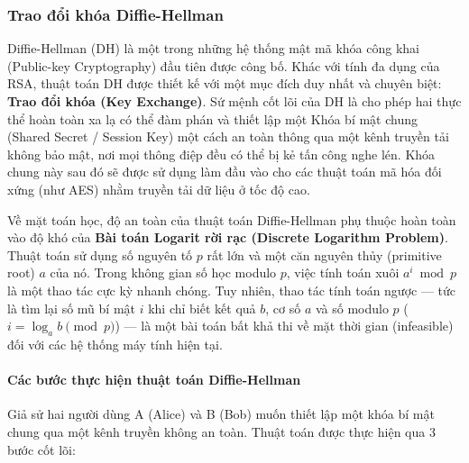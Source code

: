 \subsubsection*{Trao đổi khóa Diffie-Hellman}
Diffie-Hellman (DH) là một trong những hệ thống mật mã khóa công khai (Public-key Cryptography) đầu tiên được công bố. Khác với tính đa dụng của RSA, thuật toán DH được thiết kế với một mục đích duy nhất và chuyên biệt: \textbf{Trao đổi khóa (Key Exchange)}. Sứ mệnh cốt lõi của DH là cho phép hai thực thể hoàn toàn xa lạ có thể đàm phán và thiết lập một Khóa bí mật chung (Shared Secret / Session Key) một cách an toàn thông qua một kênh truyền tải không bảo mật, nơi mọi thông điệp đều có thể bị kẻ tấn công nghe lén. Khóa chung này sau đó sẽ được sử dụng làm đầu vào cho các thuật toán mã hóa đối xứng (như AES) nhằm truyền tải dữ liệu ở tốc độ cao.

Về mặt toán học, độ an toàn của thuật toán Diffie-Hellman phụ thuộc hoàn toàn vào độ khó của \textbf{Bài toán Logarit rời rạc (Discrete Logarithm Problem)}. Thuật toán sử dụng số nguyên tố $p$ rất lớn và một căn nguyên thủy (primitive root) $a$ của nó. Trong không gian số học modulo $p$, việc tính toán xuôi $a^i \bmod p$ là một thao tác cực kỳ nhanh chóng. Tuy nhiên, thao tác tính toán ngược — tức là tìm lại số mũ bí mật $i$ khi chỉ biết kết quả $b$, cơ số $a$ và số modulo $p$ ($i = \log_a b \pmod p$) — là một bài toán bất khả thi về mặt thời gian (infeasible) đối với các hệ thống máy tính hiện tại.

\paragraph*{Các bước thực hiện thuật toán Diffie-Hellman}

Giả sử hai người dùng A (Alice) và B (Bob) muốn thiết lập một khóa bí mật chung qua một kênh truyền không an toàn. Thuật toán được thực hiện qua 3 bước cốt lõi:

